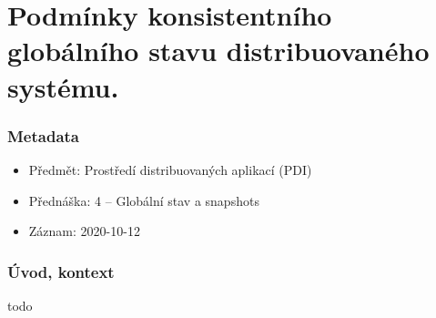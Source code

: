 

\chapter{Podmínky konsistentního globálního stavu distribuovaného systému.}

\subsection{Metadata}

\begin{itemize}
    \item Předmět: Prostředí distribuovaných aplikací (PDI)
    \item Přednáška: 4 -- Globální stav a snapshots
    \item Záznam: 2020-10-12
\end{itemize}

\subsection{Úvod, kontext}

todo

